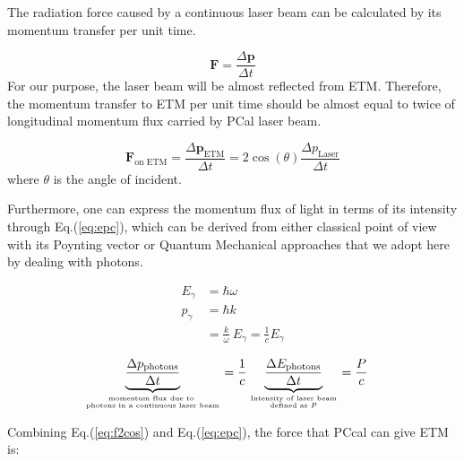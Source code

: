 The radiation force caused by a continuous laser beam can be calculated by its momentum transfer per unit time.

\begin{equation}
    \mathbf{F} = \frac{\Delta \mathbf{p}}{\Delta t}
\end{equation}
For our purpose, the laser beam will be almost reflected from ETM. Therefore, the momentum transfer to ETM per unit time should be almost equal to twice of longitudinal momentum flux carried by PCal laser beam.

\begin{equation}
\label{eq:f2cos}
    \mathbf{F}_\text{on ETM} = \frac{\Delta \mathbf{p}_\text{ETM}}{\Delta t}
    = 2 \cos(\theta) \frac{\Delta p_\text{Laser} }{\Delta t}
\end{equation}
where $\theta$ is the angle of incident.

Furthermore, one can express the momentum flux of light in terms of its intensity through Eq.(\ref{eq:epc}), which can be derived from either classical point of view with its Poynting vector or Quantum Mechanical approaches that we adopt here by dealing with photons. 

\begin{align}
   E_{\gamma} &= \hbar \omega \\
   p_{\gamma} &= \hbar k \\
              &= \frac{k}{\omega} ~ E_{\gamma} = \frac{1}{c}E_{\gamma}
\end{align}

\begin{align}
\label{eq:epc}
   \underbrace{\frac{\Delta p_{\text{photons}}}{\Delta t}}_{\text{momentum flux due to }\atop \text{photons in a continuous laser beam}}
   &= \frac{1}{c}
   \underbrace{ \frac{\Delta E_{\text{photons}}}{\Delta t} }_{\text{Intensity of laser beam}\atop \text{defined as } P}
   = \frac{P}{c} 
\end{align}

Combining Eq.(\ref{eq:f2cos}) and Eq.(\ref{eq:epc}), the force that PCcal can give ETM is:

